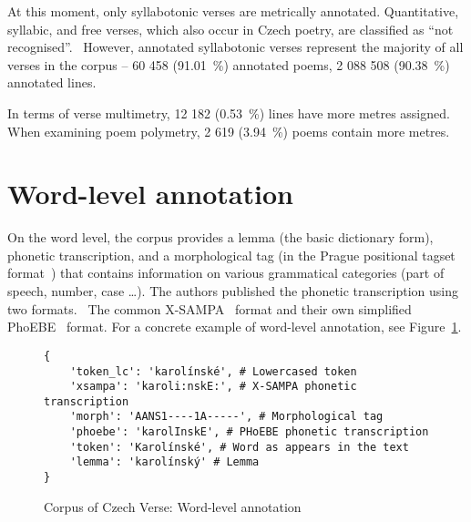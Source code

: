 At this moment, only syllabotonic verses are metrically annotated. Quantitative, syllabic, and free verses, which also occur in Czech poetry, are classified as \enquote{not recognised}.~\cite{CorpusCzechVerse} However, annotated syllabotonic verses represent the majority of all verses in the corpus -- 60 458 (91.01~\%) annotated poems, 2 088 508 (90.38~\%) annotated lines.~\cite{GitCorpusCzechVerse}

In terms of verse multimetry, 12 182 (0.53~\%) lines have more metres assigned. When examining poem polymetry, 2 619 (3.94~\%) poems contain more metres.~\cite{GitCorpusCzechVerse}

\section{Word-level annotation}
On the word level, the corpus provides a lemma (the basic dictionary form), phonetic transcription, and a morphological tag (in the Prague positional tagset format~\cite{MorphTags}) that contains information on various grammatical categories (part of speech, number, case \ldots). The authors published the phonetic transcription using two formats.~\cite{GitCorpusCzechVerse} The common X-SAMPA~\cite{X-SAMPA} format and their own simplified PhoEBE~\cite{PHoEBE} format. For a concrete example of word-level annotation, see Figure~\ref{fig:ccv-word-level-annotation}.

\begin{figure}[htpb]
\centering
\begin{verbatim}
{
    'token_lc': 'karolínské', # Lowercased token
    'xsampa': 'karoli:nskE:', # X-SAMPA phonetic transcription
    'morph': 'AANS1----1A-----', # Morphological tag
    'phoebe': 'karolInskE', # PHoEBE phonetic transcription
    'token': 'Karolínské', # Word as appears in the text
    'lemma': 'karolínský' # Lemma
}
\end{verbatim}
\caption{Corpus of Czech Verse: Word-level annotation}\label{fig:ccv-word-level-annotation}
\end{figure}